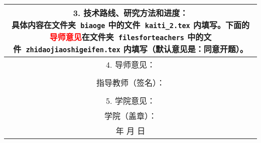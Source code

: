 \pagestyle{empty}
\section*{}\label{table:kaiti_2}
{
	\begin{tabular}{|c|c|c|c|c|c|}\hline
		\multicolumn{6}{|c|}{
			\parbox[t][11cm][t]{14.6cm}{
				3. 技术路线、研究方法和进度：\\*[.2cm]
				具体内容在文件夹~{\tt biaoge} 中的文件~{\tt kaiti\_2.tex} 内填写。下面的\textcolor{red}{导师意见}在文件夹~{\tt filesforteachers} 中的文件~{\tt zhidaojiaoshigeifen.tex} 内填写（默认意见是：同意开题）。
		}}\\\hline
		\multicolumn{6}{|c|}{
			\parbox[t][.5cm][t]{14.6cm}{
				4. 导师意见：
		}}\\
		\multicolumn{6}{|c|}{
			\parbox[t][4cm][c]{14.6cm}{
				\centering {\Large \kaitiYN}%
	}}\\
	\multicolumn{6}{|c|}{
		\parbox[t][.6cm][t]{14.6cm}{
			\hspace{5cm}指导教师（签名）：{\jiaoshi}
	}}\\
	\multicolumn{6}{|c|}{
		\parbox[t][.6cm][t]{14.6cm}{
			\hspace{8cm}\kaitiriqi
	}}\\\hline
	\multicolumn{6}{|c|}{
		\parbox[t][3cm][t]{14.6cm}{
			5. 学院意见：
	}}\\
	\multicolumn{6}{|c|}{
		\parbox[t][.6cm][t]{14.6cm}{
			\hspace{6cm}学院（盖章）：
	}}\\
	\multicolumn{6}{|c|}{
		\parbox[t][.6cm][t]{14.26cm}{
			\hspace{8cm} \hspace{.2cm}年\hspace{.5cm} 月\hspace{.5cm} 日
	}}\\\hline
\end{tabular}
}
